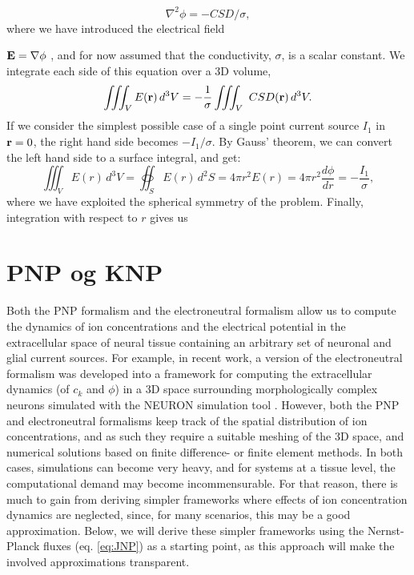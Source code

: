 \begin{equation}
\nabla^2 \phi = - CSD/\sigma,
\label{eq:trygve}
\end{equation}
where we have introduced the electrical field 

${\bf E}={\bf \nabla} \phi$ , and for now assumed that the conductivity, $\sigma$, is a scalar constant. We integrate each side of this equation over a 3D volume,
\begin{equation}
\iiint_V E({\bf r}) \,d^3V =  - \frac{1}{\sigma} \iiint_V \ CSD({\bf r}) \, d^3V.
\label{eq:trygve2}
\end{equation}
If we consider the simplest possible case of a single point current source $I_1$ in ${\bf r}=0$, the right hand side becomes $-I_1/\sigma$. By Gauss' theorem, we can convert the left hand side to a surface integral, and get:
\begin{equation}
\iiint_V E(r) \,d^3V =  \oiint_{S} E(r) \,d^2S = 4\pi r^2 E(r) = 4\pi r^2 \frac{d\phi}{dr} = -\frac{I_1}{\sigma},
\label{eq:trygve3}
\end{equation}
where we have exploited the spherical symmetry of the problem. Finally, integration with respect to $r$ gives us


\section{PNP og KNP}
Both the PNP formalism and the electroneutral formalism allow us to compute the dynamics of ion concentrations and the electrical potential in the extracellular space of neural tissue containing an arbitrary set of neuronal and glial current sources. For example, in recent work, a version of the electroneutral formalism was developed into a framework for computing the extracellular dynamics (of $c_k$ and $\phi$) in a 3D space surrounding morphologically complex neurons simulated with the NEURON simulation tool \citep{Solbra2018}. However, both the PNP and electroneutral formalisms keep track of the spatial distribution of ion concentrations, and as such they require a suitable meshing of the 3D space, and numerical solutions based on finite difference- or finite element methods. In both cases, simulations can become very heavy, and for systems at a tissue level, the computational demand may become incommensurable. For that reason, there is much to gain from deriving simpler frameworks where effects of ion concentration dynamics are neglected, since, for many scenarios, this may be a good approximation. Below, we will derive these simpler frameworks using the Nernst-Planck fluxes (eq. \ref{eq:JNP}) as a starting point, as this approach will make the involved approximations transparent.

